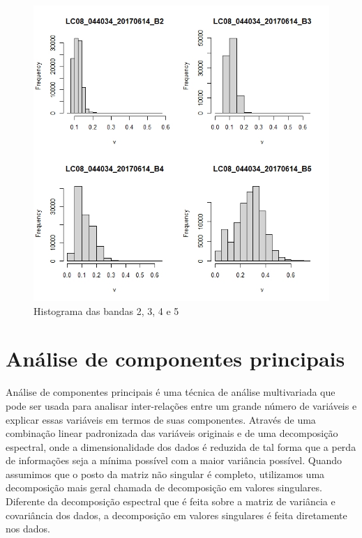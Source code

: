 \documentclass[a4paper,12pt]{article}
\begin{document}
\begin{center}
\begin{figure}[H]
    \centering
    \includegraphics[width = 1 \textwidth]{hist.jpeg}
    \caption{Histograma das bandas 2, 3, 4 e 5}
\end{figure}    
\end{center}

\section{Análise de componentes principais}

Análise de componentes principais é uma técnica de análise multivariada que pode ser usada para analisar inter-relações entre  um grande número de variáveis e explicar essas variáveis em termos de suas componentes. Através de uma combinação linear padronizada das variáveis originais  e de uma decomposição espectral, onde a dimensionalidade dos dados é reduzida de tal forma que a perda de informações seja a mínima possível com a maior variância possível. Quando assumimos que o posto da matriz não singular é completo, utilizamos uma decomposição mais geral chamada de decomposição em valores singulares. Diferente da decomposição espectral que é feita sobre a matriz de variância e covariância dos dados, a decomposição em valores singulares é feita diretamente nos dados.\\
\end{document}
